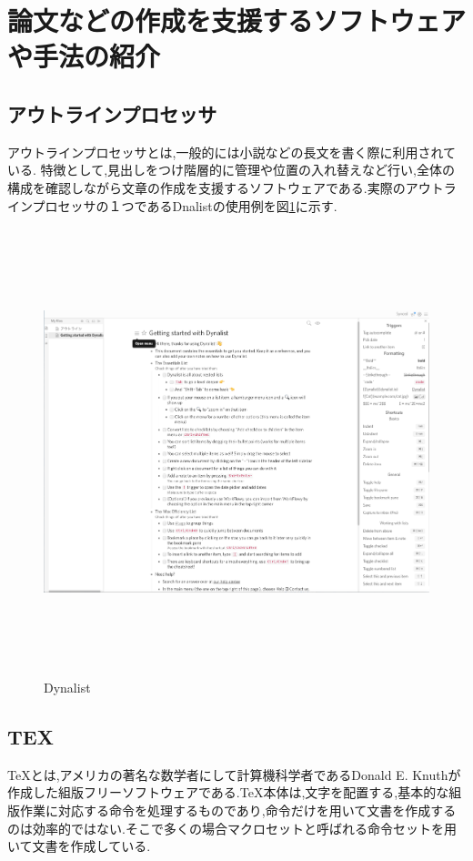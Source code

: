 \documentclass[a4j,12pt]{jarticle}
\begin{document}
\newpage
\section{論文などの作成を支援するソフトウェアや手法の紹介}
\subsection{アウトラインプロセッサ}
アウトラインプロセッサとは,一般的には小説などの長文を書く際に利用されている.
特徴として,見出しをつけ階層的に管理や位置の入れ替えなど行い,全体の構成を確認しながら文章の作成を支援するソフトウェアである.実際のアウトラインプロセッサの１つであるDnalistの使用例を図\ref{fig:b}に示す.
\begin{figure}[H]
\begin{center}
 \includegraphics[clip,width=150mm,height=130mm]{Dynalist.png}
 \end{center}
 \caption{Dynalist}
 \label{fig:b}
\end{figure}
\newpage
\subsection{TEX}
TeXとは,アメリカの著名な数学者にして計算機科学者であるDonald E. Knuthが作成した組版フリーソフトウェアである.TeX本体は,文字を配置する,基本的な組版作業に対応する命令を処理するものであり,命令だけを用いて文書を作成するのは効率的ではない.そこで多くの場合マクロセットと呼ばれる命令セットを用いて文書を作成している.
\end{document}
